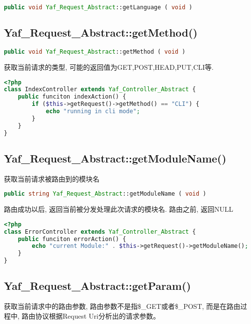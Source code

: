 \begin{lstlisting}[language=PHP]
public void Yaf_Request_Abstract::getLanguage ( void )
\end{lstlisting}


\subsection{Yaf\_Request\_Abstract::getMethod()}

\begin{lstlisting}[language=PHP]
public void Yaf_Request_Abstract::getMethod ( void )
\end{lstlisting}

获取当前请求的类型, 可能的返回值为GET,POST,HEAD,PUT,CLI等.


\begin{lstlisting}[language=PHP]
<?php
class IndexController extends Yaf_Controller_Abstract {
    public funciton indexAction() {
        if ($this->getRequest()->getMethod() == "CLI") {
            echo "running in cli mode";
        }
    }
}
\end{lstlisting}


\subsection{Yaf\_Request\_Abstract::getModuleName()}


获取当前请求被路由到的模块名

\begin{lstlisting}[language=PHP]
public string Yaf_Request_Abstract::getModuleName ( void )
\end{lstlisting}


路由成功以后, 返回当前被分发处理此次请求的模块名. 路由之前, 返回NULL

\begin{lstlisting}[language=PHP]
<?php
class ErrorController extends Yaf_Controller_Abstract {
    public funciton errorAction() {
        echo "current Module:" . $this->getRequest()->getModuleName();
    }
}
\end{lstlisting}



\subsection{Yaf\_Request\_Abstract::getParam()}

获取当前请求中的路由参数, 路由参数不是指\$\_GET或者\$\_POST, 而是在路由过程中, 路由协议根据Request Uri分析出的请求参数。

